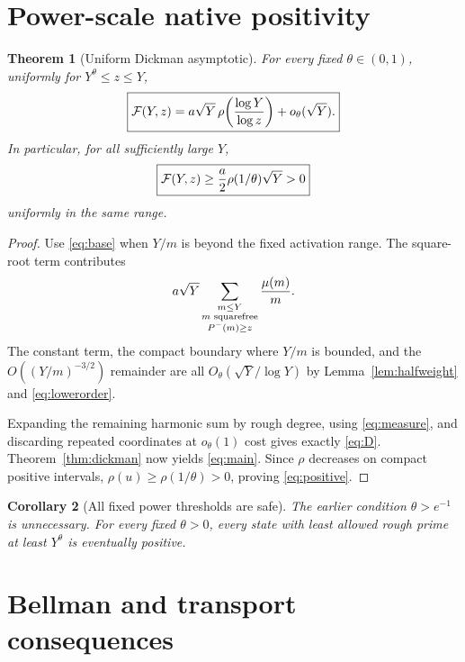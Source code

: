 \documentclass[11pt]{article}
\newtheorem{theorem}{Theorem}[section]
\newtheorem{corollary}[theorem]{Corollary}
\newcommand{\Fcal}{\mathcal F}
\begin{document}
\section{Power-scale native positivity}

\begin{theorem}[Uniform Dickman asymptotic]\label{thm:main}
For every fixed $\theta\in(0,1)$, uniformly for $Y^\theta\le z\le Y$,
\begin{equation}\label{eq:main}
 \boxed{
 \Fcal(Y,z)=a\sqrt Y\,\rho\!\left({\log Y\over\log z}\right)
 +o_\theta(\sqrt Y).
 }
\end{equation}
In particular, for all sufficiently large $Y$,
\begin{equation}\label{eq:positive}
 \boxed{
 \Fcal(Y,z)\ge {a\over2}\rho(1/\theta)\sqrt Y>0
 }
\end{equation}
uniformly in the same range.
\end{theorem}

\begin{proof}
Use \eqref{eq:base} when $Y/m$ is beyond the fixed activation range.  The
square-root term contributes
\[
 a\sqrt Y
 \sum_{\substack{m\le Y\\m\text{ squarefree}\\P^-(m)\ge z}}{\mu(m)\over m}.
\]
The constant term, the compact boundary where $Y/m$ is bounded, and the
$O((Y/m)^{-3/2})$ remainder are all
$O_\theta(\sqrt Y/\log Y)$ by Lemma~\ref{lem:halfweight} and
\eqref{eq:lowerorder}.

Expanding the remaining harmonic sum by rough degree, using
\eqref{eq:measure}, and discarding repeated coordinates at $o_\theta(1)$ cost
gives exactly \eqref{eq:D}.  Theorem~\ref{thm:dickman} now yields
\eqref{eq:main}.  Since $\rho$ decreases on compact positive intervals,
$\rho(u)\ge\rho(1/\theta)>0$, proving \eqref{eq:positive}.
\end{proof}

\begin{corollary}[All fixed power thresholds are safe]\label{cor:alltheta}
The earlier condition $\theta>e^{-1}$ is unnecessary.  For every fixed
$\theta>0$, every state with least allowed rough prime at least $Y^\theta$ is
eventually positive.
\end{corollary}

\section{Bellman and transport consequences}
\end{document}
